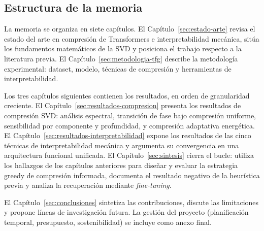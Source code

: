 \subsection{Estructura de la memoria}
\label{sec:estructura-memoria}

La memoria se organiza en siete capítulos. El Capítulo~\ref{sec:estado-arte}
revisa el estado del arte en compresión de Transformers e interpretabilidad
mecánica, sitúa los fundamentos matemáticos de la SVD y posiciona el trabajo
respecto a la literatura previa. El Capítulo~\ref{sec:metodologia-tfg} describe
la metodología experimental: dataset, modelo, técnicas de compresión y
herramientas de interpretabilidad.

Los tres capítulos siguientes contienen los resultados, en orden de granularidad
creciente. El Capítulo~\ref{sec:resultados-compresion} presenta los resultados
de compresión SVD: análisis espectral, transición de fase bajo compresión
uniforme, sensibilidad por componente y profundidad, y compresión adaptativa
energética. El Capítulo~\ref{sec:resultados-interpretabilidad} expone los
resultados de las cinco técnicas de interpretabilidad mecánica y argumenta su
convergencia en una arquitectura funcional unificada. El
Capítulo~\ref{sec:sintesis} cierra el bucle: utiliza los hallazgos de los
capítulos anteriores para diseñar y evaluar la estrategia greedy de compresión
informada, documenta el resultado negativo de la heurística previa y analiza la
recuperación mediante \emph{fine-tuning}.

El Capítulo~\ref{sec:conclusiones} sintetiza las contribuciones, discute las
limitaciones y propone líneas de investigación futura. La gestión del proyecto
(planificación temporal, presupuesto, sostenibilidad) se incluye como anexo
final.